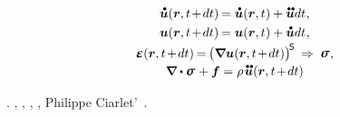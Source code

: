 \nopagebreak\vspace{-0.2em}
\begin{gather*}
\mathdotabove{\bm{u}} (\bm{r}, t \hspace{-0.3ex} + \hspace{-0.3ex} dt)
\hspace{-0.2ex} =
\mathdotabove{\bm{u}}(\bm{r}, t) + \mathdotdotabove{\bm{u}} dt \hspace{.1ex} , \\
\bm{u}( \bm{r}, t \hspace{-0.3ex} + \hspace{-0.3ex} dt )
\hspace{-0.2ex} =
\bm{u}(\bm{r}, t)
+ \mathdotabove{\bm{u}} dt
\hspace{.1ex} ,
\\[-0.1em]
%
\infinitesimaldeformation(\bm{r}, t \hspace{-0.3ex} + \hspace{-0.3ex} dt)
\hspace{-0.2ex} = \hspace{-0.2ex}
\bigl( \boldnabla \bm{u}(\bm{r}, t \hspace{-0.3ex} + \hspace{-0.3ex} dt) \bigr)^{\hspace{-0.25ex}\mathsf{S}}
\hspace{.2em} \Rightarrow \hspace{.25em}
\linearstress
\hspace{.1ex} ,
\\[-0.1em]
%
\boldnabla \dotp \linearstress \hspace{.15ex} + \bm{f}
= \rho \hspace{.2ex} \mathdotdotabove{\bm{u}}( \bm{r}, t \hspace{-0.3ex} + \hspace{-0.3ex} dt )
\end{gather*}

\vspace{-0.1em}\noindent
{}.
,
 ,
,
,
  Philippe Ciarlet’~\cite{ciarlet-mathematicalelasticity}.
